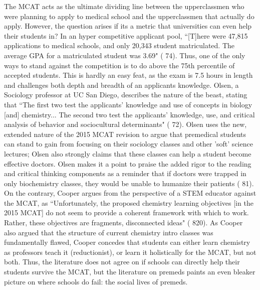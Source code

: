 \documentclass [12pt]{article}
\begin{document}
\begin{flushleft}
The MCAT acts as the ultimate dividing line between the upperclassmen who were planning to apply to medical school and the upperclassmen that actually do apply. However, the question arises if its a metric that universities can  even help their students in? In an hyper competitive applicant pool, {``}[T]here were 47,815 applications to medical schools, and only 20,343 student matriculated. The average GPA for a matriculated student was 3.69" (\cite{Olsen-2016} 74). Thus, one of the only ways to stand against the competition is to do above the 75th percentile of accepted students. This is hardly an easy feat, as the exam is 7.5 hours in length and challenges both depth and breadth of an applicants knowledge. Olsen, a Sociology professor at UC San Diego, describes the nature of the beast, stating that {``}The first two test the applicants' knowledge and use of concepts in biology [and] chemistry... The second two test the applicants' knowledge, use, and critical analysis of behavior and sociocultural determinants" (\cite{Olsen-2016} 72). Olsen uses the new, extended nature of the 2015 MCAT revision to argue that premedical students can stand to gain from focusing on their sociology classes and other 'soft' science lectures; Olsen also strongly claims that these classes can help a student become effective doctors. Olsen makes it a point to praise the added rigor to the reading and critical thinking components as a reminder that if doctors were trapped in only biochemistry classes, they would be unable to humanize their patients (\cite{Olsen-2016} 81). On the contrary, Cooper argues from the perspective of a STEM educator against the MCAT, as {``}Unfortunately, the proposed chemistry learning objectives [in the 2015 MCAT] do not seem to provide a coherent framework with which to work. Rather, these objectives are fragments, disconnected ideas" (\cite{Cooper-2013} 820). As Cooper also argued that the structure of current chemistry intro classes was fundamentally flawed, Cooper concedes that students can either learn chemistry as professors teach it (reductionist), or learn it holistically for the MCAT, but not both. Thus, the literature does not agree on if schools can directly help their students survive the MCAT, but the literature on premeds paints an even bleaker picture on where schools do fail: the social lives of premeds.
	  

\end{flushleft}
\end{document}
